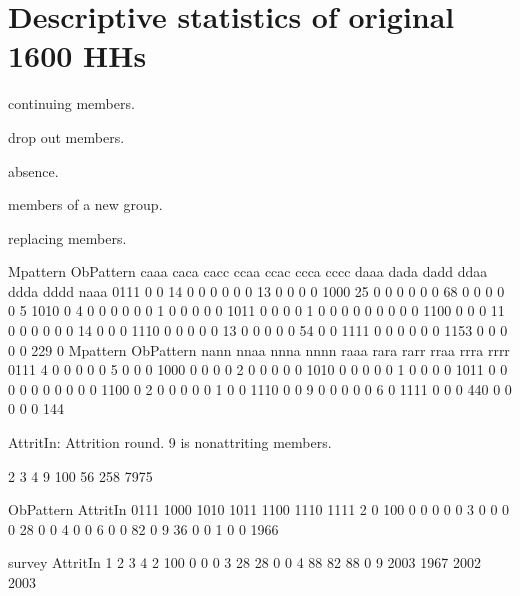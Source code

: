 \newpage
\section{Descriptive statistics of original 1600 HHs}




\begin{description}
\vspace{1.0ex}\setlength{\itemsep}{1.0ex}\setlength{\baselineskip}{12pt}
\item[c]	continuing members.
\item[d]	drop out members.
\item[a]	absence.
\item[n]	members of a new group.
\item[r]	replacing members.
\end{description}
\begin{Schunk}
\begin{Soutput}
         Mpattern
ObPattern caaa caca cacc ccaa ccac ccca cccc daaa dada dadd ddaa ddda dddd naaa
     0111    0    0   14    0    0    0    0    0    0   13    0    0    0    0
     1000   25    0    0    0    0    0    0   68    0    0    0    0    0    5
     1010    0    4    0    0    0    0    0    0    1    0    0    0    0    0
     1011    0    0    0    0    1    0    0    0    0    0    0    0    0    0
     1100    0    0    0   11    0    0    0    0    0    0   14    0    0    0
     1110    0    0    0    0    0   13    0    0    0    0    0   54    0    0
     1111    0    0    0    0    0    0 1153    0    0    0    0    0  229    0
         Mpattern
ObPattern nann nnaa nnna nnnn raaa rara rarr rraa rrra rrrr
     0111    4    0    0    0    0    0    5    0    0    0
     1000    0    0    0    0    2    0    0    0    0    0
     1010    0    0    0    0    0    1    0    0    0    0
     1011    0    0    0    0    0    0    0    0    0    0
     1100    0    2    0    0    0    0    0    1    0    0
     1110    0    0    9    0    0    0    0    0    6    0
     1111    0    0    0  440    0    0    0    0    0  144
\end{Soutput}
\end{Schunk}
\textsf{AttritIn}: Attrition round. 9 is nonattriting members.
\begin{Schunk}
\begin{Soutput}

   2    3    4    9 
 100   56  258 7975 
\end{Soutput}
\begin{Soutput}
        ObPattern
AttritIn 0111 1000 1010 1011 1100 1110 1111
       2    0  100    0    0    0    0    0
       3    0    0    0    0   28    0    0
       4    0    0    6    0    0   82    0
       9   36    0    0    1    0    0 1966
\end{Soutput}
\begin{Soutput}
        survey
AttritIn    1    2    3    4
       2  100    0    0    0
       3   28   28    0    0
       4   88   82   88    0
       9 2003 1967 2002 2003
\end{Soutput}
\end{Schunk}
